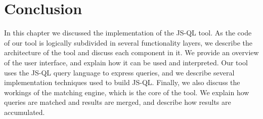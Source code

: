 \section{Conclusion}

In this chapter we discussed the implementation of the JS-QL tool. As the code of our tool is logically subdivided in several functionality layers, we describe the architecture of the tool and discuss each component in it. We provide an overview of the user interface, and explain how it can be used and interpreted. Our tool uses the JS-QL query language to express queries, and we describe several implementation techniques used to build JS-QL. Finally, we also discuss the workings of the matching engine, which is the core of the tool. We explain how queries are matched and results are merged, and describe how results are accumulated.


